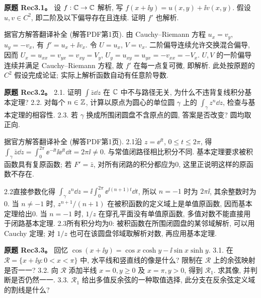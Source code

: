 \begin{exercise}
\textbf{原题 Rec3.1。}\label{ass:rec3-1}
设 $f:\mathbb C\to\mathbb C$ 解析, 写 $f(x+\ii y)=u(x,y)+\ii v(x,y)$. 假设 $u,v\in C^2$, 即二阶及以下偏导存在且连续. 证明 $f'$ 也解析.
\end{exercise}
\begin{solution}
据官方解答翻译补全 (解答PDF第1页). 由 Cauchy--Riemann 方程 $u_x=v_y$, $u_y=-v_x$, 有 $f'=u_x+\ii v_x$. 令 $U=u_x$, $V=v_x$. 二阶偏导连续允许交换混合偏导, 因而 $U_x=u_{xx}=v_{yx}=v_{xy}=V_y$, $U_y=u_{xy}=u_{yx}=-v_{xx}=-V_x$. $U,V$ 的一阶偏导连续并满足 Cauchy--Riemann 方程, 故 $f'$ 在每一点复可微, 即解析. 此处按原题的 $C^2$ 假设完成论证; 实际上解析函数自动有任意阶导数.
\end{solution}
\begin{exercise}
\textbf{原题 Rec3.2。}\label{ass:rec3-2}
2.1. 证明 $\int\bar z\dd z$ 在 $\mathbb C$ 中不与路径无关, 为什么不违背复线积分基本定理? 2.2. 对每个 $n\in\mathbb Z$, 计算以原点为圆心的单位圆 $\gamma$ 上的 $\int_\gamma z^n\dd z$, 检查与基本定理的相容性. 2.3. 若 $\gamma$ 换成所围闭圆盘不含原点的圆, 答案是否改变? 圆均取正向.
\end{exercise}
\begin{solution}
据官方解答翻译补全 (解答PDF第1页). 2.1沿 $z=\ee^{\ii t}$, $0\le t\le2\pi$, 得 $\int_\gamma\bar z\dd z=\int_0^{2\pi}\ee^{-\ii t}\ii\ee^{\ii t}\dd t=2\pi\ii\ne0$. 与常值闭路径相比积分不同. 基本定理要求被积函数具有复原函数; 若 $F'=\bar z$, 对所有闭路的积分都应为0, 这里正说明这样的原函数不存在.

2.2直接参数化得 $\int_\gamma z^n\dd z=\ii\int_0^{2\pi}\ee^{\ii(n+1)t}\dd t$, 所以 $n=-1$ 时为 $2\pi\ii$, 其余整数时为0. 当 $n\ne-1$ 时, $z^{n+1}/(n+1)$ 在被积函数的定义域上是单值原函数, 因而基本定理给出0. 当 $n=-1$ 时, $1/z$ 在穿孔平面没有单值原函数, 多值对数不能直接用于闭路基本定理. 2.3所有积分均为0: 被积函数在所围闭圆盘的某邻域解析, 可以用 Cauchy 定理; 对 $1/z$ 也可在该圆盘邻域取解析对数, 再应用基本定理.
\end{solution}
\begin{exercise}
\textbf{原题 Rec3.3。}\label{ass:rec3-3}
回忆 $\cos(x+\ii y)=\cos x\cosh y-\ii\sin x\sinh y$. 3.1. 在 $\mathcal R=\{x+\ii y:0<x<\pi\}$ 中, 水平线和竖直线的像是什么? 限制在 $\mathcal R$ 上的余弦映射是否一一? 3.2. 向 $\mathcal R$ 添加半线 $x=0,y\ge0$ 及 $x=\pi,y>0$, 得到 $\mathcal R_1$. 求其像, 并判断是否仍然一一. 3.3. $\mathcal R_1$ 给出多值反余弦的一种取值选择, 此分支在反余弦定义域的割线是什么?
\end{exercise}
